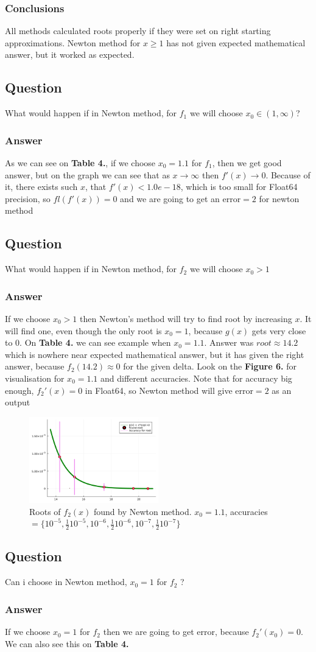 \documentclass[11pt]{article}
\begin{document}
\subsubsection{Conclusions}
All methods calculated roots properly if they were set on right starting approximations. Newton method for $x \geq 1$ has not given expected mathematical answer, but it worked as expected. 
\subsection{Question}
What would happen if in Newton method, for $f_1$ we will choose $x_0 \in (1, \infty)$?
\subsubsection*{Answer}
As we can see on \textbf{Table 4.}, if we choose $x_0 = 1.1$ for $f_1$, 
then we get good answer, but on the graph we can see that as $x \rightarrow \infty$ then $f'(x) \rightarrow 0$. 
Because of it, there exists such $x$, that $f'(x) < 1.0e-18$, which is too small for Float64 precision, so $fl(f'(x)) = 0$ and we are going to get an error$=2$ for newton method
\subsection{Question}
What would happen if in Newton method, for $f_2$ we will choose $x_0 > 1$
\subsubsection*{Answer}
If we choose $x_0 > 1$ then Newton's method will try to find root by increasing $x$. It will find one, even though the only root is $x_0 = 1$, because
$g(x)$ gets very close to $0$.  
On \textbf{Table 4.} we can see example when $x_0 = 1.1$. Answer was $root \approx 14.2$ which is nowhere near expected mathematical answer, 
but it has given the right answer, because $f_2(14.2) \approx 0$ for the given delta. Look on the \textbf{Figure 6.} for visualisation for $x_0 = 1.1$ and different accuracies.
Note that for accuracy big enough, $f_2'(x) = 0$ in Float64, so Newton method will give error$=2$ as an output

\begin{figure}[h]
    \centering
    \includegraphics[width=0.5\textwidth]{ex6_3.png}
    \caption{Roots of $f_2(x)$ found by Newton method. $x_0 = 1.1$, accuracies $= \{10^{-5}, \frac{1}{2}10^{-5}, 10^{-6}, \frac{1}{2}10^{-6}, 10^{-7}, \frac{1}{2}10^{-7}\}$}
\end{figure}
\subsection{Question}
Can i choose in Newton method, $x_0 = 1$ for $f_2$ ? 
\subsubsection*{Answer}
If we choose $x_0=1$ for $f_2$ then we are going to get error, because $f_2'(x_0) = 0$. We can also see this on \textbf{Table 4.}
\end{document}
